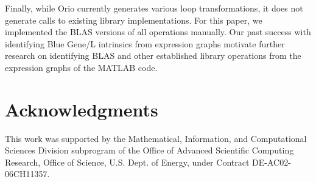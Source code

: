 \documentclass[11pt]{article}
\begin{document}
Finally, while Orio currently generates various loop transformations, it does not generate calls to existing library implementations. For this paper, we implemented the BLAS versions of all operations manually. Our past success with identifying Blue Gene/L intrinsics from expression graphs motivate further research on identifying BLAS and other established library operations from the expression graphs of the MATLAB code.

\singlespacing
\section*{Acknowledgments}
This work was supported by the Mathematical, Information, and
Computational Sciences Division subprogram of the Office of Advanced
Scientific Computing Research, Office of Science, U.S. Dept. of Energy,
under Contract DE-AC02-06CH11357. 




\vfill
\begin{flushright}
\scriptsize
{}
\normalsize
\end{flushright}
\end{document}
